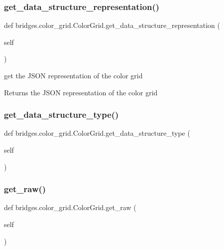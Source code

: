 \subsubsection{\texorpdfstring{get\+\_\+data\+\_\+structure\+\_\+representation()}{get\_data\_structure\_representation()}}
{\footnotesize\ttfamily def bridges.\+color\+\_\+grid.\+Color\+Grid.\+get\+\_\+data\+\_\+structure\+\_\+representation (\begin{DoxyParamCaption}\item[{}]{self }\end{DoxyParamCaption})}



get the J\+S\+ON representation of the color grid 

\begin{DoxyReturn}{Returns}
the J\+S\+ON representation of the color grid 
\end{DoxyReturn}
\mbox{\label{classbridges_1_1color__grid_1_1_color_grid_a4dbf23124fdc8edae222c100cf7b9363}} 
\subsubsection{\texorpdfstring{get\+\_\+data\+\_\+structure\+\_\+type()}{get\_data\_structure\_type()}}
{\footnotesize\ttfamily def bridges.\+color\+\_\+grid.\+Color\+Grid.\+get\+\_\+data\+\_\+structure\+\_\+type (\begin{DoxyParamCaption}\item[{}]{self }\end{DoxyParamCaption})}

\mbox{\label{classbridges_1_1color__grid_1_1_color_grid_ab6685633fe237eb118cf2db2f624cd60}} 
\subsubsection{\texorpdfstring{get\+\_\+raw()}{get\_raw()}}
{\footnotesize\ttfamily def bridges.\+color\+\_\+grid.\+Color\+Grid.\+get\+\_\+raw (\begin{DoxyParamCaption}\item[{}]{self }\end{DoxyParamCaption})}



